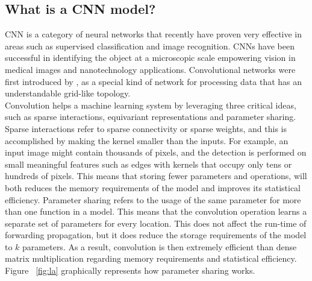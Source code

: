 \subsection{What is a CNN model?}
CNN is a category of neural networks that recently have proven very effective in areas such as supervised classification and image recognition. CNNs have been successful in identifying the object at a microscopic scale empowering vision in medical images and nanotechnology applications. Convolutional networks were first introduced by \cite{lecun1989generalization}, as a special kind of network for processing data that has an understandable grid-like topology.\\

Convolution helps a machine learning system by leveraging three critical ideas, such as sparse interactions, equivariant representations and parameter sharing. Sparse interactions refer to sparse connectivity or sparse weights, and this is accomplished by making the kernel smaller than the inputs. For example, an input image might contain thousands of pixels, and the detection is performed on small meaningful features such as edges with kernels that occupy only tens or hundreds of pixels. This means that storing fewer parameters and operations, will both reduces the memory requirements of the model and improves its statistical efficiency. Parameter sharing refers to the usage of the same parameter for more than one function in a model. This means that the convolution operation learns a separate set of parameters for every location. This does not affect the run-time of forwarding propagation, but it does reduce the storage requirements of the model to $k$ parameters. As a result, convolution is then extremely efficient than dense matrix multiplication regarding memory requirements and statistical efficiency. Figure ~\ref{fig:la} graphically represents how parameter sharing works.

